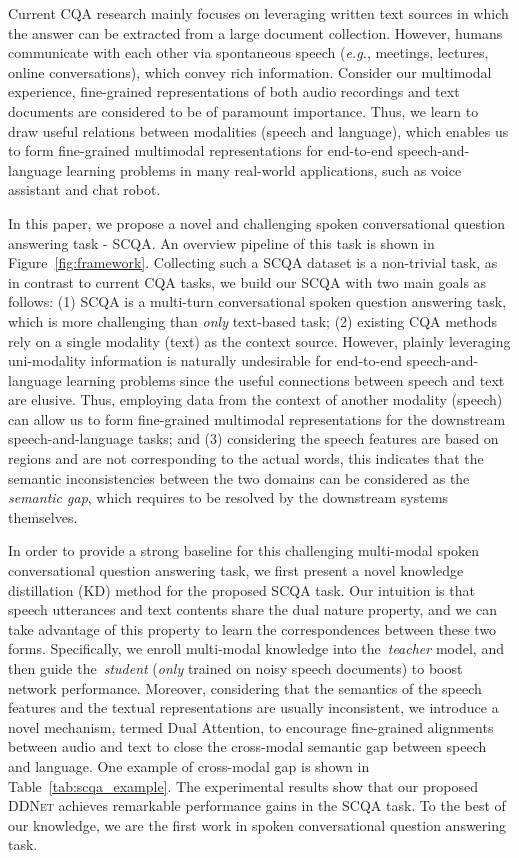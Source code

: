 \documentclass[11pt]{article}
\def\eg{\textit{e.g.}}
\begin{document}
Current CQA research mainly focuses on leveraging written text sources in which the answer can be extracted from a large document collection. However, humans communicate with each other via spontaneous speech (\eg, meetings, lectures, online conversations), which convey rich information. Consider our multimodal experience, fine-grained representations of both audio recordings and text documents are considered to be of paramount importance. Thus, we learn to draw useful relations between modalities (speech and language), which enables us to form fine-grained multimodal representations for end-to-end speech-and-language learning problems in many real-world applications, such as voice assistant and chat robot.



In this paper, we propose a novel and challenging spoken conversational question answering task - SCQA. An overview pipeline of this task is shown in Figure~\ref{fig:framework}. Collecting such a SCQA dataset is a non-trivial task, as in contrast to current CQA tasks, we build our SCQA with two main goals as follows: (1) SCQA is a multi-turn conversational spoken question answering task, which is more challenging than \textit{only} text-based task; (2) existing CQA methods rely on a single modality (text) as the context source. However, plainly leveraging uni-modality information is naturally undesirable for end-to-end speech-and-language learning problems since the useful connections between speech and text are elusive. Thus, employing data from the context of another modality (speech) can allow us to form fine-grained multimodal representations for the downstream speech-and-language tasks; and (3) considering the speech features are based on regions and are not corresponding to the actual words, this indicates that the semantic inconsistencies between the two domains can be considered as the \textit{semantic gap}, which requires to be resolved by the downstream systems themselves.

In order to provide a strong baseline for this challenging multi-modal spoken conversational question answering task, we first present a novel knowledge distillation (KD) method for the proposed SCQA task. Our intuition is that speech utterances and text contents share the dual nature property, and we can take advantage of this property to learn the correspondences between these two forms. Specifically, we enroll multi-modal knowledge into the~\textit{teacher} model, and then guide the~\textit{student} (\textit{only} trained on noisy speech documents) to boost network performance. Moreover, considering that the semantics of the speech features and the textual representations are usually inconsistent, we introduce a novel mechanism, termed Dual Attention, to encourage fine-grained alignments between audio and text to close the cross-modal semantic gap between speech and language. One example of cross-modal gap is shown in Table~\ref{tab:scqa_example}. The experimental results show that our proposed \textsc{DDNet} achieves remarkable performance gains in the SCQA task. To the best of our knowledge, we are the first work in spoken conversational question answering task.
\end{document}

